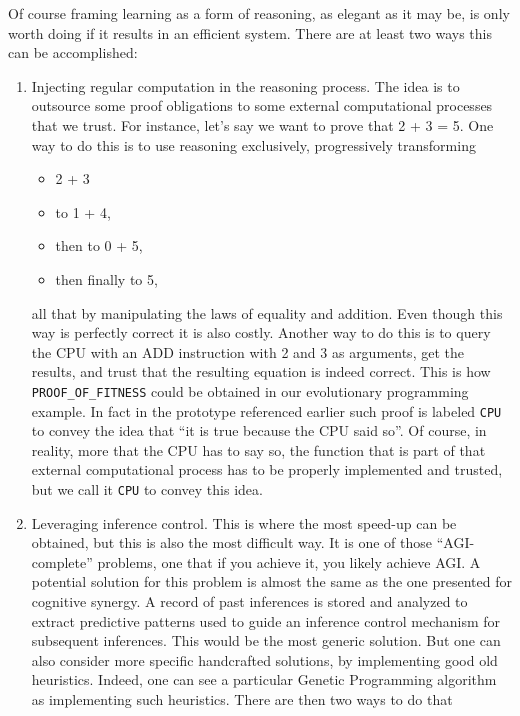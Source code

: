\documentclass[]{report}
\begin{document}
Of course framing learning as a form of reasoning, as elegant as it
may be, is only worth doing if it results in an efficient system.
There are at least two ways this can be accomplished:
\begin{enumerate}
\item Injecting regular computation in the reasoning process.  The idea
is to outsource some proof obligations to some external computational
processes that we trust.  For instance, let's say we want to prove
that 2 + 3 = 5.  One way to do this is to use reasoning exclusively,
progressively transforming
\begin{itemize}
\item 2 + 3
\item to 1 + 4,
\item then to 0 + 5,
\item then finally to 5,
\end{itemize}
all that by manipulating the laws of equality and addition.  Even
though this way is perfectly correct it is also costly.  Another way
to do this is to query the CPU with an ADD instruction with 2 and 3 as
arguments, get the results, and trust that the resulting equation is
indeed correct.  This is how \texttt{PROOF_OF_FITNESS}
could be obtained in our evolutionary programming example.  In fact in
the prototype referenced earlier such proof is labeled
\texttt{CPU} to convey the idea that ``it is true because
the CPU said so''.  Of course, in reality, more that the CPU has to
say so, the function that is part of that external computational
process has to be properly implemented and trusted, but we call it
\texttt{CPU} to convey this idea.
\item Leveraging inference control.  This is where the most speed-up can
   be obtained, but this is also the most difficult way.  It is one of
   those ``AGI-complete'' problems, one that if you achieve it, you
   likely achieve AGI.  A potential solution for this problem is
   almost the same as the one presented for cognitive synergy.  A
   record of past inferences is stored and analyzed to extract
   predictive patterns used to guide an inference control mechanism
   for subsequent inferences.  This would be the most generic
   solution.  But one can also consider more specific handcrafted
   solutions, by implementing good old heuristics.  Indeed, one can
   see a particular Genetic Programming algorithm as implementing such
   heuristics.  There are then two ways to do that
   \begin{enumerate}

\end{enumerate}
\end{enumerate}
\end{document}
